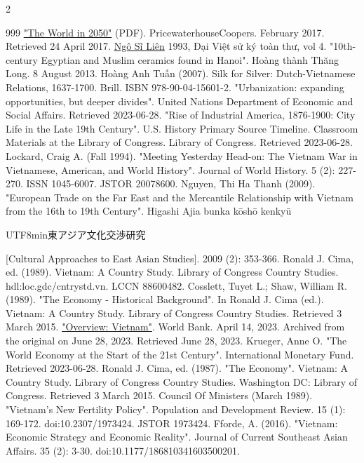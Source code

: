 \documentclass[openany]{book}
\begin{document}
\begin{multicols}{2}
\begin{thebibliography}{999}
 \href{https://www.pwc.com/gx/en/world-2050/assets/pwc-the-world-in-2050-full-report-feb-2017.pdf}{"The World in 2050"} (PDF). PricewaterhouseCoopers. February 2017. Retrieved 24 April 2017.
 \href{https://en.wikipedia.org/wiki/Ng%C3%B4_S%C4%A9_Li%C3%AAn}{Ngô Sĩ Liên} 1993, Đại Việt sử ký toàn thư, vol 4.
 "10th-century Egyptian and Muslim ceramics found in Hanoi". Hoàng thành Thăng Long. 8 August 2013.
 Hoàng Anh Tuấn (2007). Silk for Silver: Dutch-Vietnamese Relations, 1637-1700. Brill. ISBN 978-90-04-15601-2.
 "Urbanization: expanding opportunities, but deeper divides". United Nations Department of Economic and Social Affairs. Retrieved 2023-06-28.
 "Rise of Industrial America, 1876-1900: City Life in the Late 19th Century". U.S. History Primary Source Timeline. Classroom Materials at the Library of Congress. Library of Congress. Retrieved 2023-06-28.
 Lockard, Craig A. (Fall 1994). "Meeting Yesterday Head-on: The Vietnam War in Vietnamese, American, and World History". Journal of World History. 5 (2): 227-270. ISSN 1045-6007. JSTOR 20078600.
 Nguyen, Thi Ha Thanh (2009). "European Trade on the Far East and the Mercantile Relationship with Vietnam from the 16th to 19th Century". Higashi Ajia bunka kōshō kenkyū \begin{CJK*}{UTF8}{min}東アジア文化交渉研究\end{CJK*} [Cultural Approaches to East Asian Studies]. 2009 (2): 353-366.
 Ronald J. Cima, ed. (1989). Vietnam: A Country Study. Library of Congress Country Studies. hdl:loc.gdc/cntrystd.vn. LCCN 88600482.
 Cosslett, Tuyet L.; Shaw, William R. (1989). "The Economy - Historical Background". In Ronald J. Cima (ed.). Vietnam: A Country Study. Library of Congress Country Studies. Retrieved 3 March 2015.
 \href{https://www.worldbank.org/en/country/vietnam/overview}{"Overview: Vietnam"}. World Bank. April 14, 2023. Archived from the original on June 28, 2023. Retrieved June 28, 2023.
 Krueger, Anne O. "The World Economy at the Start of the 21st Century". International Monetary Fund. Retrieved 2023-06-28.
 Ronald J. Cima, ed. (1987). "The Economy". Vietnam: A Country Study. Library of Congress Country Studies. Washington DC: Library of Congress. Retrieved 3 March 2015.
 Council Of Ministers (March 1989). "Vietnam's New Fertility Policy". Population and Development Review. 15 (1): 169-172. doi:10.2307/1973424. JSTOR 1973424.
 Fforde, A. (2016). "Vietnam: Economic Strategy and Economic Reality". Journal of Current Southeast Asian Affairs. 35 (2): 3-30. doi:10.1177/186810341603500201.

\end{thebibliography}
\end{multicols}
\end{document}

